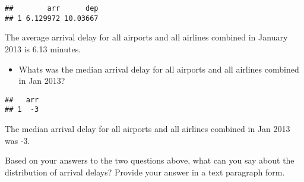 \documentclass[
]{article}
\newenvironment{Shaded}{\begin{snugshade}}{\end{snugshade}}
\newcommand{\DataTypeTok}[1]{\textcolor[rgb]{0.13,0.29,0.53}{#1}}
\newcommand{\DecValTok}[1]{\textcolor[rgb]{0.00,0.00,0.81}{#1}}
\newcommand{\KeywordTok}[1]{\textcolor[rgb]{0.13,0.29,0.53}{\textbf{#1}}}
\newcommand{\NormalTok}[1]{#1}
\newcommand{\OperatorTok}[1]{\textcolor[rgb]{0.81,0.36,0.00}{\textbf{#1}}}
\newcommand{\OtherTok}[1]{\textcolor[rgb]{0.56,0.35,0.01}{#1}}
\newcommand{\StringTok}[1]{\textcolor[rgb]{0.31,0.60,0.02}{#1}}
\providecommand{\tightlist}{%
  \setlength{\itemsep}{0pt}\setlength{\parskip}{0pt}}
\begin{document}
\begin{verbatim}
##        arr      dep
## 1 6.129972 10.03667
\end{verbatim}

The average arrival delay for all airports and all airlines combined in
January 2013 is 6.13 minutes.

\begin{itemize}
\tightlist
\item
  Whats was the median arrival delay for all airports and all airlines
  combined in Jan 2013?
\end{itemize}

\begin{Shaded}
\end{Shaded}

\begin{verbatim}
##   arr
## 1  -3
\end{verbatim}

The median arrival delay for all airports and all airlines combined in
Jan 2013 was -3.

Based on your answers to the two questions above, what can you say about
the distribution of arrival delays? Provide your answer in a text
paragraph form.

\begin{Shaded}
\end{Shaded}
\end{document}
